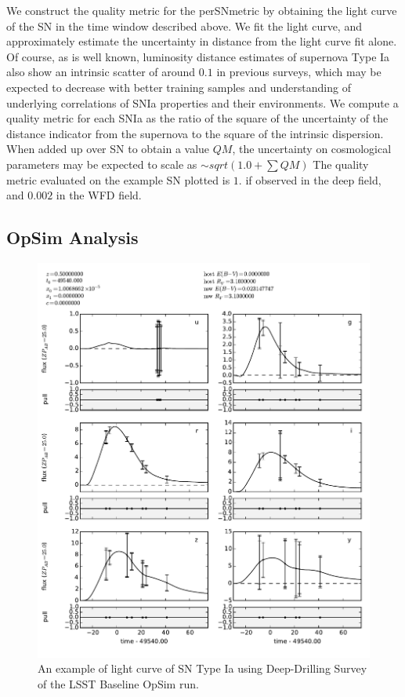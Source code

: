 We construct the quality metric for the perSNmetric by obtaining the
light curve of the SN in the time window described above. We fit the
light curve, and approximately estimate the uncertainty in distance from
the light curve fit alone. Of course, as is well known, luminosity
distance estimates of supernova Type Ia also show an intrinsic scatter
of around $0.1$ in previous surveys, which may be expected to decrease
with better training samples and understanding of underlying
correlations of SNIa properties and their environments. We compute a
quality metric for each SNIa as the ratio of the square of the
uncertainty of the distance indicator from the supernova to the square
of the intrinsic dispersion. When added up over SN to obtain a value
$QM$, the uncertainty on cosmological parameters may be expected to
scale as $\sim sqrt(1.0 + \sum QM)$ The quality metric evaluated on the
example SN plotted is $1.$ if observed in the deep field, and $0.002$ in
the WFD field.



\subsection{OpSim Analysis}
\label{sec:\secname:analysis}




\begin{figure}[tbh!]
\includegraphics[angle=0,width=14truecm]{figs/SN_290_lc.pdf}
\caption{An example of light curve of SN Type Ia using Deep-Drilling
Survey of the LSST Baseline OpSim run.
}
\label{fig:SNIaLCopsimdeep}
\end{figure}



